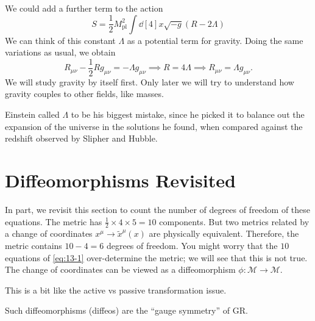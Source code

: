 We could add a further term to the action
\begin{equation}
  \label{eq:eintein-hilbert-action}
  S = \frac{1}{2} M^2_{\text{pl}} \int \dd[4]{x} \sqrt{-g} \left( R - 2 \Lambda \right)
\end{equation}
We can think of this constant $\Lambda$ as a potential term for gravity.
Doing the same variations as usual, we obtain
\begin{equation}
  R_{\mu\nu} - \frac{1}{2} R g_{\mu\nu} = - \Lambda g_{\mu\nu} \implies R = 4 \Lambda \implies R_{\mu\nu} = \Lambda g_{\mu\nu}.
  \label{eq:13-1}
\end{equation}
We will study gravity by itself first. Only later we will try to understand how gravity couples to other fields, like masses.
\begin{leftbar}
  \begin{remark}
    Einstein called $\Lambda$ to be his biggest mistake, since he picked it to balance out the expansion of the universe in the solutions he found, when compared against the redshift observed by Slipher and Hubble.
  \end{remark}
\end{leftbar}

\section{Diffeomorphisms Revisited}%
\label{sec:diffeomorphisms_revisited}

In part, we revisit this section to count the number of degrees of freedom of these equations.
The metric has $\frac{1}{2} \times 4 \times 5 = 10$ components.
But two metrics related by a change of coordinates $x^{\mu} \to \widetilde{x}^{\mu}(x)$ are physically equivalent. Therefore, the metric contains $10 - 4 = 6$ degrees of freedom.
You might worry that the $10$ equations of \eqref{eq:13-1} over-determine the metric; we will see that this is not true.
The change of coordinates can be viewed as a diffeomorphism $\phi \colon \mathcal{M} \to \mathcal{M}$.
\begin{leftbar}
  \begin{remark}
    This is a bit like the active vs passive transformation issue.
  \end{remark}
\end{leftbar}
Such diffeomorphisms (diffeos) are the ``gauge symmetry'' of GR.

